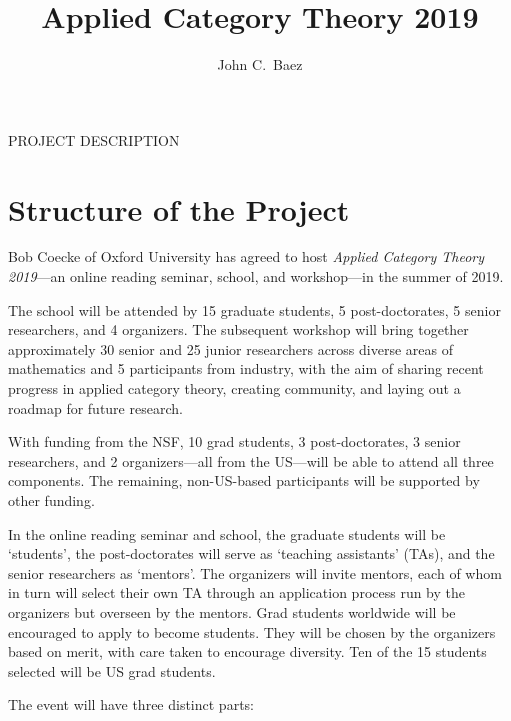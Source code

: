 \documentclass[12pt]{amsart}
\begin{document}
\thispagestyle{empty}
\pagestyle{empty}

\centerline{\large PROJECT DESCRIPTION}
\title{Applied Category Theory 2019}
\author{John C.\ Baez}

\maketitle


\section{Structure of the Project}
\thispagestyle{empty}

Bob Coecke of Oxford University has agreed to host
\textsl{Applied Category Theory 2019}---an online
reading seminar, school, and workshop---in the summer of 2019. 

The school will be attended by 15 graduate students, 5
post-doctorates, 5 senior researchers, and 4 organizers.
The subsequent workshop will bring together approximately 30
senior and 25 junior researchers across diverse areas of
mathematics and 5 participants from industry, with the aim
of sharing recent progress in applied category theory,
creating community, and laying out a roadmap for future
research.

With funding from the NSF, 10 grad students, 3
post-doctorates, 3 senior researchers, and 2
organizers---all from the US---will be able to attend all
three components.  The remaining, non-US-based participants
will be supported by other funding.

In the online reading seminar and school, the graduate
students will be `students', the post-doctorates will serve
as `teaching assistants' (TAs), and the senior researchers
as `mentors'.  The organizers will invite mentors, each of
whom in turn will select their own TA through an application
process run by the organizers but overseen by the mentors.
Grad students worldwide will be encouraged to apply to
become students.  They will be chosen by the organizers
based on merit, with care taken to encourage diversity.  Ten
of the 15 students selected will be US grad students.

The event will have three distinct parts:
\end{document}
